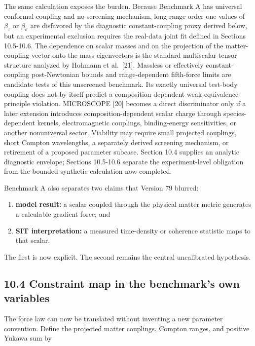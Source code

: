 \documentclass[
  american,
  11pt,
  letterpaper,
]{article}
\providecommand{\tightlist}{%
  \setlength{\itemsep}{0pt}\setlength{\parskip}{0pt}}
\begin{document}
The same calculation exposes the burden. Because Benchmark A has universal conformal coupling and no screening mechanism, long-range order-one values of \(\beta_\tau\) or \(\beta_\sigma\) are disfavored by the diagnostic constant-coupling proxy derived below, but an experimental exclusion requires the real-data joint fit defined in Sections 10.5-10.6. The dependence on scalar masses and on the projection of the matter-coupling vector onto the mass eigenvectors is the standard multiscalar-tensor structure analyzed by Hohmann et al.~{[}21{]}. Massless or effectively constant-coupling post-Newtonian bounds and range-dependent fifth-force limits are candidate tests of this unscreened benchmark. Its exactly universal test-body coupling does not by itself predict a composition-dependent weak-equivalence-principle violation. MICROSCOPE {[}20{]} becomes a direct discriminator only if a later extension introduces composition-dependent scalar charge through species-dependent kernels, electromagnetic couplings, binding-energy sensitivities, or another nonuniversal sector. Viability may require small projected couplings, short Compton wavelengths, a separately derived screening mechanism, or retirement of a proposed parameter subcase. Section 10.4 supplies an analytic diagnostic envelope; Sections 10.5-10.6 separate the experiment-level obligation from the bounded synthetic calculation now completed.

Benchmark A also separates two claims that Version 79 blurred:

\begin{enumerate}
\def\labelenumi{\arabic{enumi}.}
\tightlist
\item
  \textbf{model result:} a scalar coupled through the physical matter metric generates a calculable gradient force; and
\item
  \textbf{SIT interpretation:} a measured time-density or coherence statistic maps to that scalar.
\end{enumerate}

The first is now explicit. The second remains the central uncalibrated hypothesis.

\subsection{10.4 Constraint map in the benchmark's own variables}\label{constraint-map-in-the-benchmarks-own-variables}

The force law can now be translated without inventing a new parameter convention. Define the projected matter couplings, Compton ranges, and positive Yukawa sum by
\end{document}
